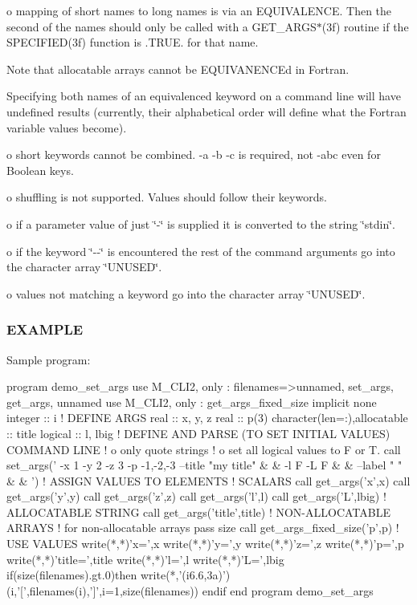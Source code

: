 o mapping of short names to long names is via an E\+Q\+U\+I\+V\+A\+L\+E\+N\+CE. Then the second of the names should only be called with a G\+E\+T\+\_\+\+A\+R\+G\+S$\ast$(3f) routine if the S\+P\+E\+C\+I\+F\+I\+E\+D(3f) function is .T\+R\+UE. for that name.

Note that allocatable arrays cannot be E\+Q\+U\+I\+V\+A\+N\+E\+N\+C\+Ed in Fortran.

Specifying both names of an equivalenced keyword on a command line will have undefined results (currently, their alphabetical order will define what the Fortran variable values become).

o short keywords cannot be combined. -\/a -\/b -\/c is required, not -\/abc even for Boolean keys.

o shuffling is not supported. Values should follow their keywords.

o if a parameter value of just \char`\"{}-\/\char`\"{} is supplied it is converted to the string \char`\"{}stdin\char`\"{}.

o if the keyword \char`\"{}-\/-\/\char`\"{} is encountered the rest of the command arguments go into the character array \char`\"{}\+U\+N\+U\+S\+E\+D\char`\"{}.

o values not matching a keyword go into the character array \char`\"{}\+U\+N\+U\+S\+E\+D\char`\"{}.

\subsubsection*{E\+X\+A\+M\+P\+LE}

Sample program\+: \begin{DoxyVerb}program demo_set_args
use M_CLI2,  only : filenames=>unnamed, set_args, get_args, unnamed
use M_CLI2,  only : get_args_fixed_size
implicit none
integer                      :: i
! DEFINE ARGS
real                         :: x, y, z
real                         :: p(3)
character(len=:),allocatable :: title
logical                      :: l, lbig
!  DEFINE AND PARSE (TO SET INITIAL VALUES) COMMAND LINE
!   o only quote strings
!   o set all logical values to F or T.
call set_args(' -x 1 -y 2 -z 3 -p -1,-2,-3 --title "my title" &
        & -l F -L F &
        & --label " " &
        & ')
! ASSIGN VALUES TO ELEMENTS
! SCALARS
call get_args('x',x)
call get_args('y',y)
call get_args('z',z)
call get_args('l',l)
call get_args('L',lbig)
! ALLOCATABLE STRING
call get_args('title',title)
! NON-ALLOCATABLE ARRAYS
! for non-allocatable arrays pass size
call get_args_fixed_size('p',p)
! USE VALUES
write(*,*)'x=',x
write(*,*)'y=',y
write(*,*)'z=',z
write(*,*)'p=',p
write(*,*)'title=',title
write(*,*)'l=',l
write(*,*)'L=',lbig
if(size(filenames).gt.0)then
   write(*,'(i6.6,3a)')(i,'[',filenames(i),']',i=1,size(filenames))
endif
end program demo_set_args
\end{DoxyVerb}
